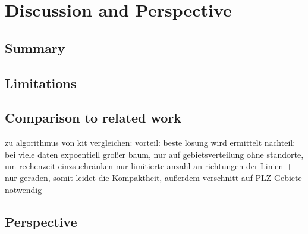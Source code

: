 \section{Discussion and Perspective}
\subsection{Summary}
\subsection{Limitations}
\subsection{Comparison to related work}

zu algorithmus von kit vergleichen:
vorteil: beste lösung wird ermittelt
nachteil: bei viele daten expoentiell großer baum, nur auf gebietsverteilung ohne standorte, um rechenzeit einzsuchränken nur limitierte anzahl an richtungen der Linien + nur geraden, somit leidet die Kompaktheit, außerdem verschnitt auf PLZ-Gebiete notwendig


\subsection{Perspective}